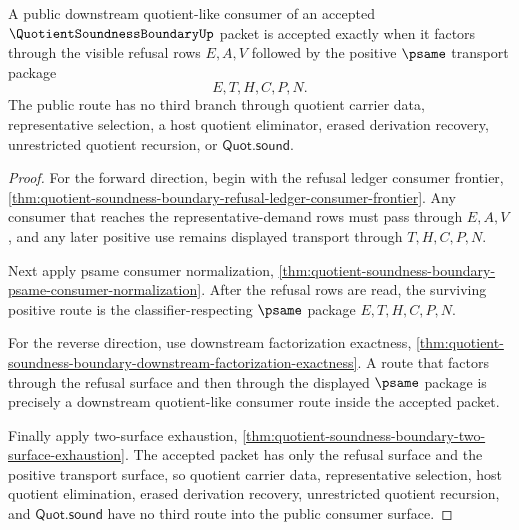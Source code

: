 \begin{theorem}
\label{thm:quotient-soundness-boundary-refusal-consumer-public-exactness}
A public downstream quotient-like consumer of an accepted $\QuotientSoundnessBoundaryUp$ packet is accepted exactly when it factors through the visible refusal rows $E,A,V$ followed by the positive $\psame$ transport package
$$
E,T,H,C,P,N.
$$
The public route has no third branch through quotient carrier data, representative selection, a host quotient eliminator, erased derivation recovery, unrestricted quotient recursion, or $\mathsf{Quot.sound}$.
\end{theorem}
\begin{proof}
For the forward direction, begin with the refusal ledger consumer frontier, \autoref{thm:quotient-soundness-boundary-refusal-ledger-consumer-frontier}. Any consumer that reaches the representative-demand rows must pass through $E,A,V$, and any later positive use remains displayed transport through $T,H,C,P,N$.

Next apply psame consumer normalization, \autoref{thm:quotient-soundness-boundary-psame-consumer-normalization}. After the refusal rows are read, the surviving positive route is the classifier-respecting $\psame$ package $E,T,H,C,P,N$.

For the reverse direction, use downstream factorization exactness, \autoref{thm:quotient-soundness-boundary-downstream-factorization-exactness}. A route that factors through the refusal surface and then through the displayed $\psame$ package is precisely a downstream quotient-like consumer route inside the accepted packet.

Finally apply two-surface exhaustion, \autoref{thm:quotient-soundness-boundary-two-surface-exhaustion}. The accepted packet has only the refusal surface and the positive transport surface, so quotient carrier data, representative selection, host quotient elimination, erased derivation recovery, unrestricted quotient recursion, and $\mathsf{Quot.sound}$ have no third route into the public consumer surface.
\end{proof}


